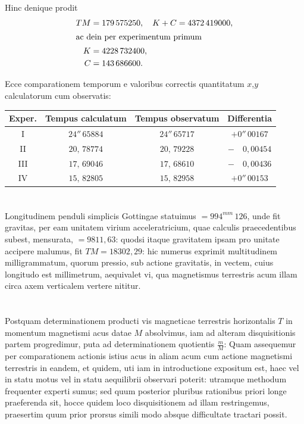 \documentclass[fontsize=11pt,paper=a4,twoside,openany]{scrbook}
\begin{document}
Hinc denique prodit
\begin{align*}
TM &= 179\,575250,\quad K+C = 4372\,419000,\\
\intertext{ac dein per experimentum primum}
K &= 4228\,732400,\\
C &= 143\,686600.
\end{align*}

Ecce comparationem temporum e valoribus correctis quantitatum $x$,$y$ calculatorum cum observatis:

\begin{center}
\small
\begin{tabular}{|c|c|c|c|}
\hline
Exper. & Tempus calculatum & Tempus observatum & Differentia \\
\hline
I & $24''\,65884$ & $24''\,65717$ & $+0''\,00167$ \\
II & $20,\,78774$ & $20,\,79228$ & $-\phantom{0''}0{,}00454$ \\
III & $17,\,69046$ & $17,\,68610$ & $-\phantom{0''}0{,}00436$ \\
IV & $15,\,82805$ & $15,\,82958$ & $+0''\,00153$ \\
\hline
\end{tabular}
\end{center}

\section{}

Longitudinem penduli simplicis Gottingae statuimus $=994^{mm}\,126$, unde fit gravitas, per eam unitatem virium acceleratricium, quae calculis praecedentibus subest, mensurata, $=9811{,}63$: quodsi itaque gravitatem ipsam pro unitate accipere malumus, fit $TM=18302{,}29$: hic numerus exprimit multitudinem milligrammatum, quorum pressio, sub actione gravitatis, in vectem, cuius longitudo est millimetrum, aequivalet vi, qua magnetismus terrestris acum illam circa axem verticalem vertere nititur.

\section{}

Postquam determinationem producti vis magneticae terrestris horizontalis $T$ in momentum magnetismi acus datae $M$ absolvimus, iam ad alteram disquisitionis partem progredimur, puta ad determinationem quotientis $\frac{m}{M}$: Quam assequemur per comparationem actionis istius acus in aliam acum cum actione magnetismi terrestris in eandem, et quidem, uti iam in introductione expositum est, haec vel in statu motus vel in statu aequilibrii observari poterit: utramque methodum frequenter experti sumus; sed quum posterior pluribus rationibus priori longe praeferenda sit, hocce quidem loco disquisitionem ad illam restringemus, praesertim quum prior prorsus simili modo absque difficultate tractari possit.
\end{document}
